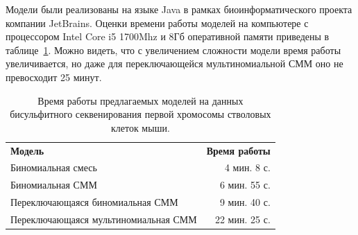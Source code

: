 Модели были реализованы на языке Java в рамках биоинформатического проекта компании JetBrains.
Оценки времени работы моделей на компьютере с процессором Intel Core i5 1700Mhz и 8Гб оперативной
памяти приведены в таблице~\ref{tab:time}. Можно видеть, что с увеличением сложности модели время
работы увеличивается, но даже для переключающейся мультиномиальной СММ оно не превосходит
25 минут.

\begin{table}[htbp!]
  \centering
  \begin{tabular}{lr}
    \textbf{Модель} & \textbf{Время работы} \\
    \noalign{\nobreak\smallskip}
    Биномиальная смесь & 4 мин. 8 с. \\
    Биномиальная СММ & 6 мин. 55 с. \\
    Переключающаяся биномиальная СММ & 9 мин. 40 с. \\
    Переключающаяся мультиномиальная СММ & 22 мин. 25 с. \\
  \end{tabular}
  \caption{Время работы предлагаемых моделей на данных бисульфитного секвенирования
    первой хромосомы стволовых клеток мыши.}
  \label{tab:time}
\end{table}
